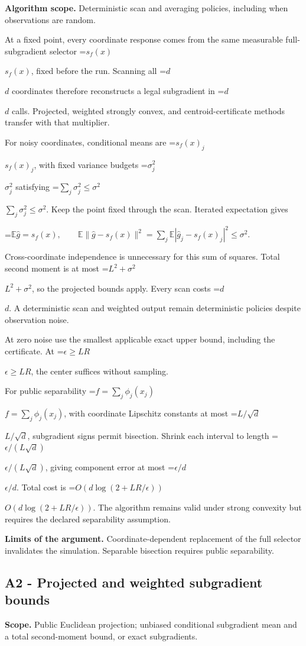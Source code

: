 \documentclass[10pt,a4paper]{article}
\newcommand{\AtlasMath}[1]{\par\begingroup\centering\setbox0=\hbox{$\displaystyle #1$}\ifdim\wd0>1.4\linewidth\typeout{ATLAS WIDE FORMULA: \the\wd0}\fi\ifdim\wd0>\linewidth\resizebox{\linewidth}{!}{\box0}\else\box0\fi\par\endgroup}
\newcommand{\AtlasInlineMath}[1]{\begingroup\setbox0=\hbox{$#1$}\ifdim\wd0>.4\linewidth\endgroup\AtlasMath{#1}\else\endgroup$#1$\fi}
\begin{document}
\textbf{Algorithm scope.} Deterministic scan and averaging policies, including when observations are random.

At a fixed point, every coordinate response comes from the same measurable full-subgradient selector \AtlasInlineMath{s_f(x)}, fixed before the run. Scanning all \AtlasInlineMath{d} coordinates therefore reconstructs a legal subgradient in \AtlasInlineMath{d} calls. Projected, weighted strongly convex, and centroid-certificate methods transfer with that multiplier.

For noisy coordinates, conditional means are \AtlasInlineMath{s_f(x)_j}, with fixed variance budgets \AtlasInlineMath{\sigma_j^2} satisfying \AtlasInlineMath{\sum_j\sigma_j^2\le\sigma^2}. Keep the point fixed through the scan. Iterated expectation gives

\AtlasMath{\mathbb E\widehat g=s_f(x),\qquad
\mathbb E\|\widehat g-s_f(x)\|^2
=\sum_j\mathbb E|\widehat g_j-s_f(x)_j|^2\le\sigma^2.}

Cross-coordinate independence is unnecessary for this sum of squares. Total second moment is at most \AtlasInlineMath{L^2+\sigma^2}, so the projected bounds apply. Every scan costs \AtlasInlineMath{d}. A deterministic scan and weighted output remain deterministic policies despite observation noise.

At zero noise use the smallest applicable exact upper bound, including the certificate. At \AtlasInlineMath{\epsilon\ge LR}, the center suffices without sampling.

For public separability \AtlasInlineMath{f=\sum_j\phi_j(x_j)}, with coordinate Lipschitz constants at most \AtlasInlineMath{L/\sqrt d}, subgradient signs permit bisection. Shrink each interval to length \AtlasInlineMath{\epsilon/(L\sqrt d)}, giving component error at most \AtlasInlineMath{\epsilon/d}. Total cost is \AtlasInlineMath{O(d\log(2+LR/\epsilon))}. The algorithm remains valid under strong convexity but requires the declared separability assumption.

\textbf{Limits of the argument.} Coordinate-dependent replacement of the full selector invalidates the simulation. Separable bisection requires public separability.

\subsection{A2 - Projected and weighted subgradient bounds}
\textbf{Scope.} Public Euclidean projection; unbiased conditional subgradient mean and a total second-moment bound, or exact subgradients.
\end{document}
